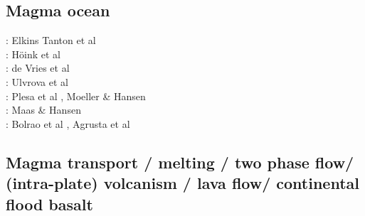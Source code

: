 \subsection{Magma ocean}

\begin{scriptsize}
\twothousandtwo: Elkins Tanton et al \cite{elvh02}\\
\twothousandsix: H\"oink et al\cite{hosh06}\\
\twothousandten: de Vries et al \cite{devv10}\\
\twothousandtwelve: Ulvrova et al \cite{ullc12}\\
\twothousandthirteen: Plesa et al \cite{plth13}, Moeller \& Hansen \cite{moha13}\\
\twothousandfifteen: Maas \& Hansen \cite{maha15}\\
\twothousandtwenty: Bolrao et al \cite{bobm20}, Agrusta et al \cite{agml20}
\end{scriptsize}

\subsection{Magma transport / melting / two phase flow/ (intra-plate) volcanism / lava flow/ 
continental flood basalt}

